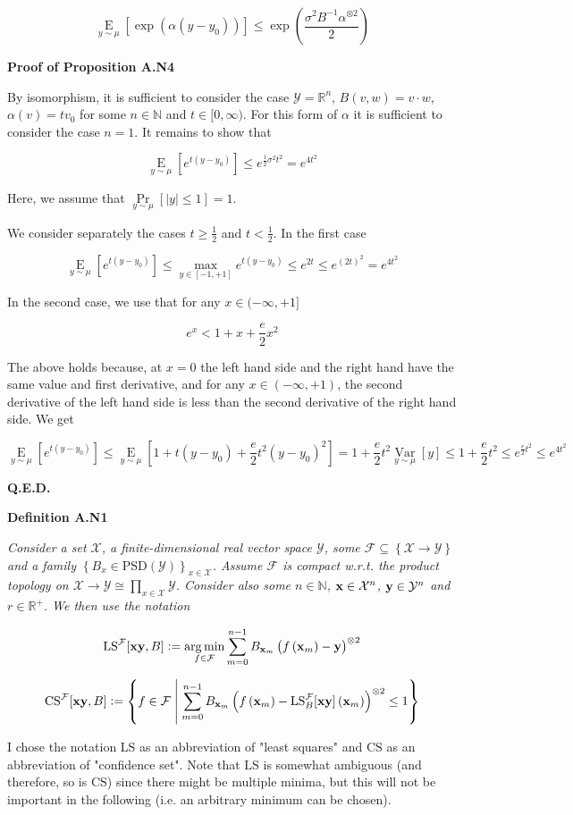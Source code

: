\documentclass[a4paper]{article}
\newcommand{\Co}[1]{}
\newcommand{\AP}[1]{\left(#1\right)}
\newcommand{\AB}[1]{\left[#1\right]}
\newcommand{\AC}[1]{\left\{#1\right\}}
\newcommand{\ACM}[2]{\left\{#1\;\middle\vert\;#2\right\}}
\newcommand{\Pa}[2]{\underset{#1}{\operatorname{Pr}}\AB{#2}}
\newcommand{\Ea}[2]{\underset{#1}{\operatorname{E}}\AB{#2}}
\newcommand{\Var}[2]{\underset{#1}{\operatorname{Var}}\AB{#2}}
\newcommand{\Argmin}[1]{\underset{#1}{\operatorname{arg\,min}}\,}
\newcommand{\Nats}{\mathbb{N}}
\newcommand{\Reals}{\mathbb{R}}
\newcommand{\PSD}{\mathrm{PSD}}
\newcommand{\Abs}[1]{\left\vert #1 \right\vert}
\newcommand{\B}{B}
\newcommand{\X}{\mathcal{X}}
\newcommand{\Y}{\mathcal{Y}}
\newcommand{\F}{\mathcal{F}}
\newcommand{\LS}{\mathrm{LS}}
\newcommand{\CS}{\mathrm{CS}}
\begin{document}
$$\Ea{y\sim\mu}{\exp\AP{\alpha\AP{y-y_0}}} \leq \exp\AP{\frac{\sigma^2\B ^{-1}\alpha^{\otimes 2}}{2}}$$

\textbf{Proof of Proposition A.N4}\Co{b}

By isomorphism, it is sufficient to consider the case $\Y=\Reals^n$, $B(v,w)=v\cdot w$, $\alpha(v)=tv_0$ for some $n\in\Nats$ and $t\in[0,\infty)$. For this form of $\alpha$ it is sufficient to consider the case $n=1$. It remains to show that

$$\Ea{y\sim\mu}{e^{t\AP{y-y_0}}}\leq e^{\frac{1}{2}\sigma^2t^2}=e^{4t^2}$$

Here, we assume that $\Pa{y\sim\mu}{\Abs{y}\leq1}=1$.

We consider separately the cases $t\geq\frac{1}{2}$ and $t<\frac{1}{2}$. In the first case

$$\Ea{y\sim\mu}{e^{t\AP{y-y_0}}}\leq \max_{y\in[-1,+1]}{e^{t(y-y_0)}} \leq e^{2t}\leq e^{(2t)^2}=e^{4t^2}$$

In the second case, we use that for any $x\in(-\infty,+1]$

$$e^x<1+x+\frac{e}{2}x^2$$

The above holds because, at $x=0$ the left hand side and the right hand have the same value and first derivative, and for any $x\in(-\infty,+1)$, the second derivative of the left hand side is less than the second derivative of the right hand side. We get

$$\Ea{y\sim\mu}{e^{t\AP{y-y_0}}}\leq\Ea{y\sim\mu}{1+t\AP{y-y_0}+\frac{e}{2}t^2\AP{y-y_0}^2}=1+\frac{e}{2}t^2\Var{y\sim\mu}{y}\leq1+\frac{e}{2}t^2\leq e^{\frac{e}{2}t^2}\leq e^{4t^2}$$

\textbf{Q.E.D.}\Co{b}

\textbf{Definition A.N1}\Co{b}

\textit{Consider a set $\X$, a finite-dimensional real vector space $\Y$, some $\F\subseteq\AC{\X\rightarrow\Y}$ and a family $\AC{\B _x\in\PSD(\Y)}_{x\in\X}$. Assume $\F$ is compact w.r.t. the product topology on $\X\rightarrow\Y\cong\prod_{x\in\X}\Y$. Consider also some $n\in\Nats$, $\bold{x}\in\X^n$, $\bold{y}\in\Y^n$ and $r\in\Reals^+$. We then use the notation}\Co{i}

$$\LS^{\F}[\bold{xy},\B]:=\Argmin{f\in\F}{\sum_{m=0}^{n-1}\B _{\bold{x}_m}\AP{f\AP{\bold{x}_m}-\bold{y} }^{\otimes2}}$$

$$\CS^{\F}[\bold{xy},B]:=\ACM{f\in\F}{\sum_{m=0}^{n-1}\B _{\bold{x}_m}\AP{f\AP{\bold{x}_m}-\LS_\B ^\F[\bold{xy}]\AP{\bold{x}_m}}^{\otimes2}\leq 1}$$

I chose the notation $\LS$ as an abbreviation of "least squares" and $\CS$ as an abbreviation of "confidence set". Note that $\LS$ is somewhat ambiguous (and therefore, so is $\CS$) since there might be multiple minima, but this will not be important in the following (i.e. an arbitrary minimum can be chosen).
\end{document}
